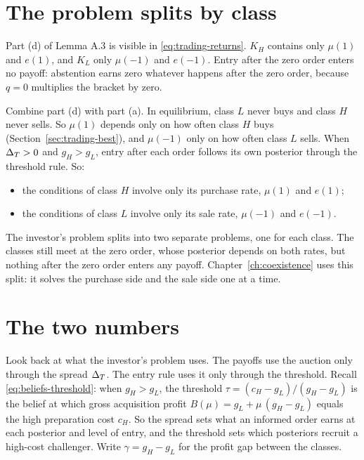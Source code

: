 \section{The problem splits by class}\label{sec:trading-split}

Part (d) of Lemma A.3 is visible in \eqref{eq:trading-returns}. \(K_H\) contains only \(\mu(1)\) and \(e(1)\), and
\(K_L\) only \(\mu(-1)\) and \(e(-1)\). Entry after the zero order enters no payoff: abstention earns zero whatever
happens after the zero order, because \(q=0\) multiplies the bracket by zero.

Combine part (d) with part (a). In equilibrium, class \(L\) never buys and class \(H\) never sells. So
\(\mu(1)\) depends only on how often class \(H\) buys (Section~\ref{sec:trading-best}), and \(\mu(-1)\) only on how
often class \(L\) sells. When \(\Delta_T>0\) and \(g_H>g_L\), entry after each order follows its own posterior through
the threshold rule. So:
\begin{itemize}
\item the conditions of class \(H\) involve only its purchase rate, \(\mu(1)\) and \(e(1)\);
\item the conditions of class \(L\) involve only its sale rate, \(\mu(-1)\) and \(e(-1)\).
\end{itemize}
The investor's problem splits into two separate problems, one for each class. The classes still meet at the zero
order, whose posterior depends on both rates, but nothing after the zero order enters any payoff.
Chapter~\ref{ch:coexistence} uses this split: it solves the purchase side and the sale side one at a time.

\section{The two numbers}\label{sec:trading-twonumbers}

Look back at what the investor's problem uses. The payoffs use the auction only through the spread \(\Delta_T\). The
entry rule uses it only through the threshold. Recall \eqref{eq:beliefs-threshold}: when \(g_H>g_L\), the
threshold \(\tau=(c_H-g_L)/(g_H-g_L)\) is the belief at which gross acquisition profit
\(B(\mu)=g_L+\mu\,(g_H-g_L)\) equals the high preparation cost \(c_H\). So the spread sets what an informed order
earns at each posterior and level of entry, and the threshold sets which posteriors recruit a high-cost
challenger. Write \(\gamma=g_H-g_L\) for the profit gap between the classes.

